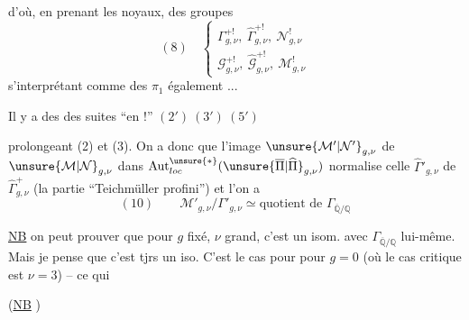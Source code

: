 d'où, en prenant les noyaux, des groupes
\[
(8)\quad\left\{\begin{array}{l}
\Gamma^{+!}_{g,\nu},\ \widehat\Gamma^{+!}_{g,\nu},\ \mathcal N^!_{g,\nu}\\
\mathcal G^{+!}_{g,\nu},\ \widehat{\mathcal G}^{+!}_{g,\nu},\ \mathcal M^!_{g,\nu}
\end{array}\right.
\]
s'interprétant comme des $\pi_1$ également ...

Il y a des des suites ``en $!$''
 $(2')\ (3')\ (5')$



prolongeant (2) et (3). On a donc que l'image $\unsure{\mathcal M'|\mathcal N'}_{g,\nu}$ de $\unsure{\mathcal M|\mathcal N}_{g,\nu}$ dans $\operatorname{Aut}^{\unsure{*}}_{loc}(\unsure{\overline\Pi|\widehat\Pi}_{g,\nu})$ normalise celle $\widehat\Gamma'_{g,\nu}$ de $\widehat\Gamma^+_{g,\nu}$ (la partie ``Teichmüller profini'') et l'on a
\[
(10)\qquad \mathcal M'_{g,\nu}/\Gamma'_{g,\nu}\simeq\text{quotient de }\Gamma_{\overline{\mathbb Q}/\mathbb Q}
\]

\uline{NB} on peut prouver que pour $g$ fixé, $\nu$ grand, c'est un isom. avec $\Gamma_{\overline{\mathbb Q}/\mathbb Q}$ lui-même. Mais je pense que c'est tjrs un iso.  C'est le cas pour pour $g=0$ (où le cas critique est $\nu=3$) -- ce qui  

(\uline{NB}
)

